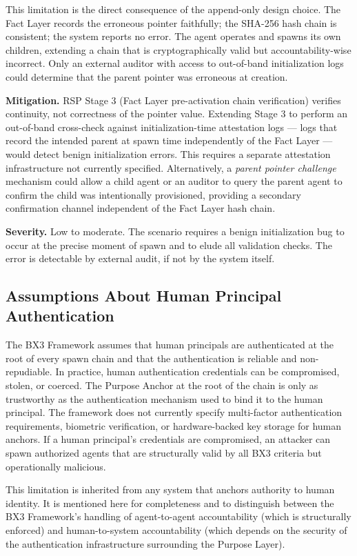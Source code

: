 This limitation is the direct consequence of the append-only design choice. The Fact Layer records the erroneous pointer faithfully; the SHA-256 hash chain is consistent; the system reports no error. The agent operates and spawns its own children, extending a chain that is cryptographically valid but accountability-wise incorrect. Only an external auditor with access to out-of-band initialization logs could determine that the parent pointer was erroneous at creation.

\textbf{Mitigation.} RSP Stage 3 (Fact Layer pre-activation chain verification) verifies continuity, not correctness of the pointer value. Extending Stage 3 to perform an out-of-band cross-check against initialization-time attestation logs — logs that record the intended parent at spawn time independently of the Fact Layer — would detect benign initialization errors. This requires a separate attestation infrastructure not currently specified. Alternatively, a \textit{parent pointer challenge} mechanism could allow a child agent or an auditor to query the parent agent to confirm the child was intentionally provisioned, providing a secondary confirmation channel independent of the Fact Layer hash chain.

\textbf{Severity.} Low to moderate. The scenario requires a benign initialization bug to occur at the precise moment of spawn and to elude all validation checks. The error is detectable by external audit, if not by the system itself.

\subsection{Assumptions About Human Principal Authentication}

The BX3 Framework assumes that human principals are authenticated at the root of every spawn chain and that the authentication is reliable and non-repudiable. In practice, human authentication credentials can be compromised, stolen, or coerced. The Purpose Anchor at the root of the chain is only as trustworthy as the authentication mechanism used to bind it to the human principal. The framework does not currently specify multi-factor authentication requirements, biometric verification, or hardware-backed key storage for human anchors. If a human principal's credentials are compromised, an attacker can spawn authorized agents that are structurally valid by all BX3 criteria but operationally malicious.

This limitation is inherited from any system that anchors authority to human identity. It is mentioned here for completeness and to distinguish between the BX3 Framework's handling of agent-to-agent accountability (which is structurally enforced) and human-to-system accountability (which depends on the security of the authentication infrastructure surrounding the Purpose Layer).


